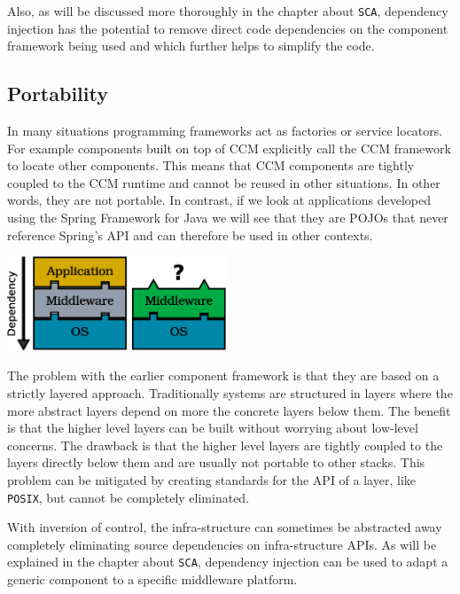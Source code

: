 Also, as will be discussed more thoroughly in the chapter about \texttt{SCA}, dependency injection has the potential to remove
direct code dependencies on the component framework being used and which further helps to simplify the code.

\subsection{Portability}

In many situations programming frameworks act as factories or service locators. For example components built on top of CCM
explicitly call the CCM framework to locate other components. This means that CCM components are tightly coupled to
the CCM runtime and cannot be reused in other situations. In other words, they are not portable. In contrast, if we look at
applications developed using the Spring Framework for Java we will see that they are POJOs that never reference Spring's API
and can therefore be used in other contexts.

\begin{center}
\includegraphics[height=80pt]{graphics_tables/bad_layers.eps} 
\end{center}

The problem with the earlier component framework is that they are based on a strictly layered approach. Traditionally systems
are structured in layers where the more abstract layers depend on more the concrete layers below them. The benefit is that
the higher level layers can be built without worrying about low-level concerns. The drawback is that the higher level
layers are tightly coupled to the layers directly below them and are usually not portable to other stacks.
This problem can be mitigated by creating standards for the API of a layer, like \texttt{POSIX}, but cannot be completely
eliminated. 

With inversion of control, the infra-structure can sometimes be abstracted away completely eliminating source dependencies
on infra-structure APIs. As will be explained in the chapter about \texttt{SCA}, dependency injection can be used to adapt
a generic component to a specific middleware platform.

